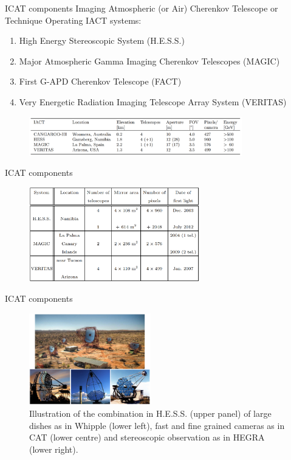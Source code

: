 \documentclass{beamer}
\begin{document}
\begin{frame}{ICAT components}
	Imaging Atmospheric (or Air) Cherenkov Telescope or Technique
	\newline
	Operating IACT systems:
	\begin{enumerate}
		\item High Energy Stereoscopic System (H.E.S.S.)
		\item Major Atmospheric Gamma Imaging Cherenkov Telescopes (MAGIC)
		\item First G-APD Cherenkov Telescope (FACT)
		\item Very Energetic Radiation Imaging Telescope Array System (VERITAS)
	\end{enumerate}
	\begin{figure}[h]
		\includegraphics[width=350px]{IACT_tables.png}
	\end{figure}
\end{frame}

\begin{frame}{ICAT components}
	\begin{figure}[h]
		\includegraphics[width=280px]{ICATsystems.png}
	\end{figure}
\end{frame}


\begin{frame}{ICAT components}
	\begin{figure}[h]
		\includegraphics[width=200px]{dishes.png}
		\caption{Illustration of the combination in H.E.S.S. (upper panel) of large dishes as in Whipple (lower left), fast and fine grained cameras as in CAT (lower centre) and stereoscopic observation as in HEGRA (lower right).}
	\end{figure}
\end{frame}
\end{document}
